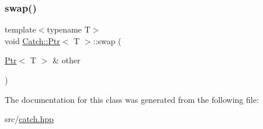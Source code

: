 \mbox{\label{class_catch_1_1_ptr_a172bf8b4e71e26a5a4d92f5b02158b50}} 
\subsubsection{\texorpdfstring{swap()}{swap()}}
{\footnotesize\ttfamily template$<$typename T$>$ \\
void \hyperlink{class_catch_1_1_ptr}{Catch\+::\+Ptr}$<$ T $>$\+::swap (\begin{DoxyParamCaption}\item[{\hyperlink{class_catch_1_1_ptr}{Ptr}$<$ T $>$ \&}]{other }\end{DoxyParamCaption})\hspace{0.3cm}{\ttfamily [inline]}}



The documentation for this class was generated from the following file\+:\begin{DoxyCompactItemize}
\item 
src/\hyperlink{catch_8hpp}{catch.\+hpp}\end{DoxyCompactItemize}
